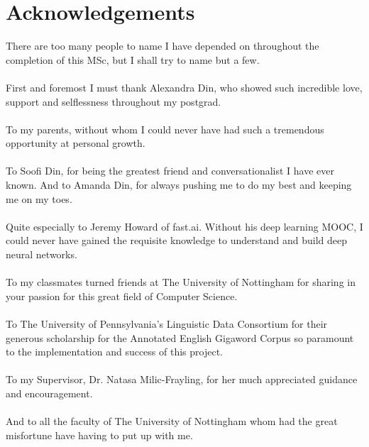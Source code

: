 \section*{Acknowledgements}
There are too many people to name I have depended on throughout the completion of this MSc, but I shall try to name but a few.
\\
\\
First and foremost I must thank Alexandra Din, who showed such incredible love, support and selflessness throughout my postgrad.
\\
\\
To my parents, without whom I could never have had such a tremendous opportunity at personal growth.
\\
\\
To Soofi Din, for being the greatest friend and conversationalist I have ever known.  And to Amanda Din, for always pushing me to do my best and keeping me on my toes.
\\
\\
Quite especially to Jeremy Howard of fast.ai. Without his deep learning MOOC, I could never have gained the requisite knowledge to understand and build deep neural networks.
\\
\\
To my classmates turned friends at The University of Nottingham for sharing in your passion for this great field of Computer Science.
\\
\\
To The University of Pennsylvania's Linguistic Data Consortium for their generous scholarship for the Annotated English Gigaword Corpus so paramount to the implementation and success of this project.
\\
\\
To my Supervisor, Dr. Natasa Milic-Frayling, for her much appreciated guidance and encouragement.
\\
\\
And to all the faculty of The University of Nottingham whom had the great misfortune have having to put up with me.
